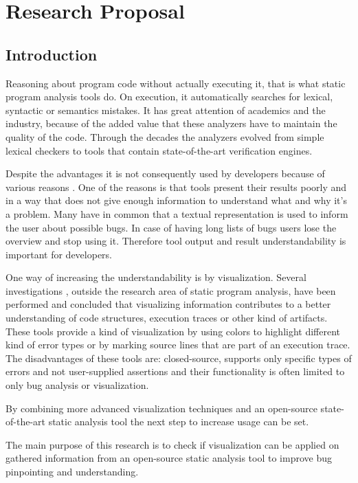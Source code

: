 \chapter{Research Proposal}
\label{chap:Research Proposa}



\section{Introduction}
Reasoning about program code without actually executing it, that is what static program analysis tools do. On execution, it automatically searches for lexical, syntactic or semantics mistakes. It has great attention of academics and the industry, because of the added value that these analyzers have to maintain the quality of the code. Through the decades the analyzers evolved from simple lexical checkers to tools that contain state-of-the-art verification engines. 
\par Despite the advantages it is not consequently used by developers because of various reasons \cite{Joh13}. One of the reasons is that tools present their results poorly and in a way that does not give enough information to understand what and why it's a problem. Many have in common that a textual representation is used to inform the user about possible bugs. In case of having long lists of bugs users lose the overview and stop using it. Therefore tool output and result understandability is important for developers.
\par One way of increasing the understandability is by visualization. Several investigations \cite{Ump06, Cor11}, outside the research area of static program analysis, have been performed and concluded that visualizing information contributes to a better understanding of code structures, execution traces or other kind of artifacts. These tools provide a kind of visualization by using colors to highlight different kind of error types or by marking source lines that are part of an execution trace. The disadvantages of these tools are: closed-source, supports only specific types of errors and not user-supplied assertions and their functionality is often limited to only bug analysis or visualization.  
\par By combining more advanced visualization techniques and an open-source state-of-the-art static analysis tool the next step to increase usage can be set. 
\par The main purpose of this research is to check if visualization can be applied on gathered information from an open-source static analysis tool to improve bug pinpointing and understanding.

